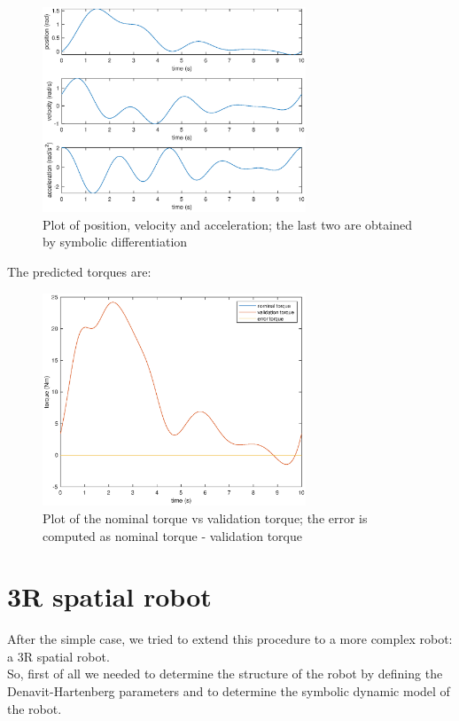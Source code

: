 \documentclass{article}
\begin{document}
\begin{figure}[!htbp]
\centering
\includegraphics[width=0.7\textwidth]{images/1-dof/validation_trajectory.eps}
\caption{Plot of position, velocity and acceleration; the last two are obtained by symbolic differentiation}
\end{figure}
\FloatBarrier

The predicted torques are:

\begin{figure}[!htbp]
\centering
\includegraphics[width=0.7\textwidth]{images/1-dof/validation.eps}
\caption{Plot of the nominal torque vs validation torque; the error is computed as nominal torque - validation torque}
\end{figure}
\FloatBarrier

\pagebreak

\section{3R spatial robot}
After the simple case, we tried to extend this procedure to a more complex robot: a 3R spatial robot.\\
So, first of all we needed to determine the structure of the robot by defining the Denavit-Hartenberg parameters and to determine the symbolic dynamic model of the robot.
\end{document}
